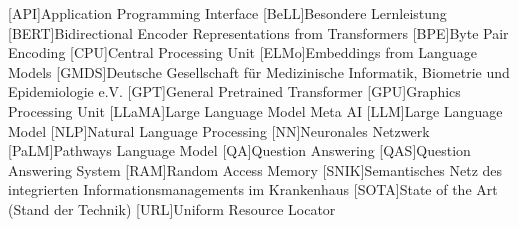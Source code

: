 \begin{acronym}[SPARQL]
    [API]{Application Programming Interface}
    [BeLL]{Besondere Lernleistung}
    [BERT]{Bidirectional Encoder Representations from Transformers}
    [BPE]{Byte Pair Encoding}
    [CPU]{Central Processing Unit}
    [ELMo]{Embeddings from Language Models}
    [GMDS]{Deutsche Gesellschaft für Medizinische Informatik, Biometrie und Epidemiologie e.V.}
    [GPT]{General Pretrained Transformer}
    [GPU]{Graphics Processing Unit}
    [LLaMA]{Large Language Model Meta AI}
    [LLM]{Large Language Model}
    [NLP]{Natural Language Processing}
    [NN]{Neuronales Netzwerk}
    [PaLM]{Pathways Language Model}
    [QA]{Question Answering}
    [QAS]{Question Answering System}
    [RAM]{Random Access Memory}
    [SNIK]{Semantisches Netz des integrierten Informationsmanagements im Krankenhaus}
    [SOTA]{State of the Art (Stand der Technik)}
    [URL]{Uniform Resource Locator}
\end{acronym}

